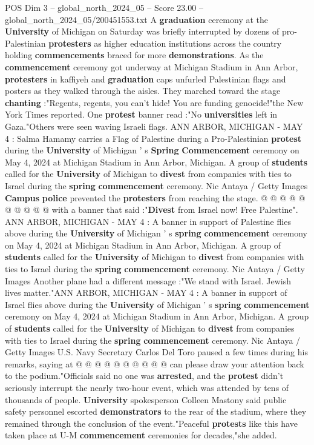 \begin{textsample}{POS Dim 3 – global\_north\_2024\_05 – Score 23.00 – global\_north\_2024\_05/200451553.txt}  \label{ex:f3_pos_009}
A \textbf{graduation} ceremony at the \textbf{University} of Michigan on Saturday was briefly interrupted by dozens of pro-Palestinian \textbf{protesters} as higher education institutions across the country holding \textbf{commencements} braced for more \textbf{demonstrations}.
As the \textbf{commencement} ceremony got underway at Michigan Stadium in Ann Arbor, \textbf{protesters} in kaffiyeh and \textbf{graduation} caps unfurled Palestinian flags and posters as they walked through the aisles.
They marched toward the stage \textbf{chanting} :"Regents, regents, you can't hide!
You are funding genocide!"the New York Times reported.
One \textbf{protest} banner read :"No \textbf{universities} left in Gaza."Others were seen waving Israeli flags.
ANN ARBOR, MICHIGAN - MAY 4 : Salma Hamamy carries a Flag of Palestine during a Pro-Palestinian \textbf{protest} during the \textbf{University} of Michigan ' s \textbf{Spring} \textbf{Commencement} ceremony on May 4, 2024 at Michigan Stadium in Ann Arbor, Michigan.
A group of \textbf{students} called for the \textbf{University} of Michigan to \textbf{divest} from companies with ties to Israel during the \textbf{spring} \textbf{commencement} ceremony.
Nic Antaya / Getty Images \textbf{Campus} \textbf{police} prevented the \textbf{protesters} from reaching the stage. @ @ @ @ @ @ @ @ @ @ with a banner that said :"\textbf{Divest} from Israel now!
Free Palestine".
ANN ARBOR, MICHIGAN - MAY 4 : A banner in support of Palestine flies above during the \textbf{University} of Michigan ' s \textbf{spring} \textbf{commencement} ceremony on May 4, 2024 at Michigan Stadium in Ann Arbor, Michigan.
A group of \textbf{students} called for the \textbf{University} of Michigan to \textbf{divest} from companies with ties to Israel during the \textbf{spring} \textbf{commencement} ceremony.
Nic Antaya / Getty Images Another plane had a different message :"We stand with Israel.
Jewish lives matter."ANN ARBOR, MICHIGAN - MAY 4 : A banner in support of Israel flies above during the \textbf{University} of Michigan ' s \textbf{spring} \textbf{commencement} ceremony on May 4, 2024 at Michigan Stadium in Ann Arbor, Michigan.
A group of \textbf{students} called for the \textbf{University} of Michigan to \textbf{divest} from companies with ties to Israel during the \textbf{spring} \textbf{commencement} ceremony.
Nic Antaya / Getty Images U.S.
Navy Secretary Carlos Del Toro paused a few times during his remarks, saying at @ @ @ @ @ @ @ @ @ @ can please draw your attention back to the podium."Officials said no one was \textbf{arrested}, and the \textbf{protest} didn't seriously interrupt the nearly two-hour event, which was attended by tens of thousands of people. \textbf{University} spokesperson Colleen Mastony said public safety personnel escorted \textbf{demonstrators} to the rear of the stadium, where they remained through the conclusion of the event."Peaceful \textbf{protests} like this have taken place at U-M \textbf{commencement} ceremonies for decades,"she added.

\end{textsample}

